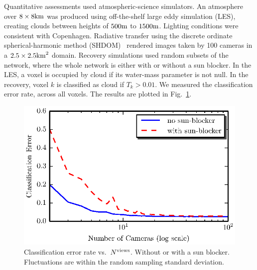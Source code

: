 \documentclass[runningheads]{llncs}
\begin{document}
Quantitative assessments used atmospheric-science simulators.
An atmosphere over $8\times8{\rm km}$  was produced using off-the-shelf large eddy simulation (LES), creating clouds between heights of $500{\rm m}$ to $1500{\rm m}$.
Lighting conditions were consistent with Copenhagen.
Radiative transfer using the discrete ordinate spherical-harmonic method (SHDOM)~\cite{Evans1998} rendered images taken by 100 cameras in a $2.5\times 2.5{\rm km}^2$ domain. Recovery simulations used random subsets
of the network, where the whole network is either with or without
a sun blocker. In the LES, a voxel is occupied by cloud if its water-mass parameter is not null. In the recovery, voxel $k$ is classified as cloud if $T_k>0.01$.
We measured the classification error rate, across all voxels.
The results are plotted in Fig.~\ref{fig:simulations}. 
\begin{figure}[t]
  \begin{center}
    \includegraphics[width=0.65\linewidth]{figures/simulations.eps}
    \vspace{-0.2cm}
    \caption{Classification error rate vs.~{$N^{\rm views}$}. Without or with a sun blocker.  Fluctuations are within the random sampling standard deviation.}
    \label{fig:simulations}
  \end{center}
\end{figure}
\end{document}
